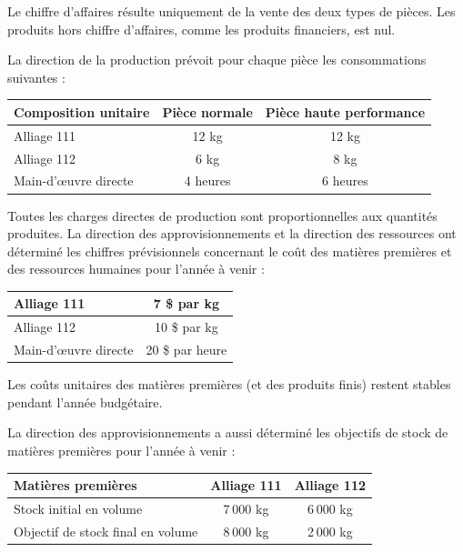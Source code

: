 \documentclass[oneside]{kaobook}
\begin{document}
Le chiffre d’affaires résulte uniquement de la vente des deux types de pièces. Les produits hors chiffre d’affaires, comme les produits financiers, est nul.

La direction de la production prévoit pour chaque pièce les consommations suivantes :

\begin{center}
\footnotesize
\begin{tabular}{l c c}
Composition unitaire & Pièce normale & Pièce haute performance\\
\hline
Alliage 111 & 12 kg & 12 kg\\
Alliage 112 & 6 kg & 8 kg\\
Main-d'œuvre directe & 4 heures & 6 heures\\
\end{tabular}
\end{center}

Toutes les charges directes de production sont proportionnelles aux quantités produites. La direction des approvisionnements et la direction des ressources ont déterminé les chiffres prévisionnels concernant le coût des matières premières et des ressources humaines pour l'année à venir :

\begin{center}
\footnotesize
\begin{tabular}{l c}
Alliage 111 & 7 \$ par kg\\
\hline
Alliage 112 & 10 \$ par kg\\
Main-d’œuvre directe & 20 \$ par heure\\
\end{tabular}
\end{center}
Les coûts unitaires des matières premières (et des produits finis) restent stables pendant l’année budgétaire.

La direction des approvisionnements a aussi déterminé les objectifs de stock de matières premières pour l'année à venir :

\begin{center}
\footnotesize
\begin{tabular}{l c c}
Matières premières & Alliage 111 & Alliage 112\\
\hline
Stock initial en volume & 7 000 kg & 6 000 kg\\
Objectif de stock final en volume & 8 000 kg & 2 000 kg\\
\end{tabular}
\end{center}
\end{document}
